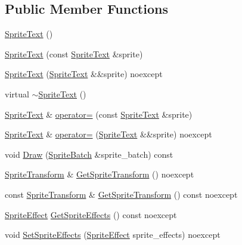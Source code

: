 \subsection*{Public Member Functions}
\begin{DoxyCompactItemize}
\item 
\hyperlink{classmage_1_1_sprite_text_ae55645d53a2f774703603139a80dd84b}{Sprite\+Text} ()
\item 
\hyperlink{classmage_1_1_sprite_text_a6dce7aa2dfa9d63d11e37e41acf82e52}{Sprite\+Text} (const \hyperlink{classmage_1_1_sprite_text}{Sprite\+Text} \&sprite)
\item 
\hyperlink{classmage_1_1_sprite_text_a4a5292d05ad76644d9b914cdc26ce4d6}{Sprite\+Text} (\hyperlink{classmage_1_1_sprite_text}{Sprite\+Text} \&\&sprite) noexcept
\item 
virtual \hyperlink{classmage_1_1_sprite_text_aa30d68a79775dce902c190f2cd298bb4}{$\sim$\+Sprite\+Text} ()
\item 
\hyperlink{classmage_1_1_sprite_text}{Sprite\+Text} \& \hyperlink{classmage_1_1_sprite_text_a727e8c9e79fb0caab58c9121e798467b}{operator=} (const \hyperlink{classmage_1_1_sprite_text}{Sprite\+Text} \&sprite)
\item 
\hyperlink{classmage_1_1_sprite_text}{Sprite\+Text} \& \hyperlink{classmage_1_1_sprite_text_a203a5e33e16d412691d43928809e5a50}{operator=} (\hyperlink{classmage_1_1_sprite_text}{Sprite\+Text} \&\&sprite) noexcept
\item 
void \hyperlink{classmage_1_1_sprite_text_a7db90f9aaebdda3cf9410c11729fd609}{Draw} (\hyperlink{classmage_1_1_sprite_batch}{Sprite\+Batch} \&sprite\+\_\+batch) const
\item 
\hyperlink{classmage_1_1_sprite_transform}{Sprite\+Transform} \& \hyperlink{classmage_1_1_sprite_text_af2d7d48fd0134a9d713c3a4820ac09ba}{Get\+Sprite\+Transform} () noexcept
\item 
const \hyperlink{classmage_1_1_sprite_transform}{Sprite\+Transform} \& \hyperlink{classmage_1_1_sprite_text_aa1b83ca76e72decf0b476d07a9a35c83}{Get\+Sprite\+Transform} () const noexcept
\item 
\hyperlink{namespacemage_a9cfe18123066ba4236f548f9de75d881}{Sprite\+Effect} \hyperlink{classmage_1_1_sprite_text_a2bd9f195c3c31906c2b3dbf276f5bc97}{Get\+Sprite\+Effects} () const noexcept
\item 
void \hyperlink{classmage_1_1_sprite_text_ab457137566eb5a57562c7ff6d387fc93}{Set\+Sprite\+Effects} (\hyperlink{namespacemage_a9cfe18123066ba4236f548f9de75d881}{Sprite\+Effect} sprite\+\_\+effects) noexcept

\end{DoxyCompactItemize}
